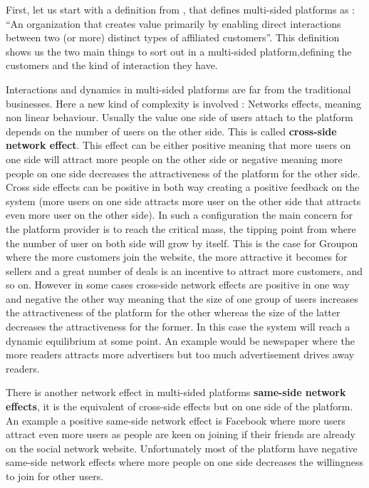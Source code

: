 \documentclass[10pt]{report}
\begin{document}
First, let us start with a definition from \autocite{Hagiu2011}, that defines multi-sided platforms as : \enquote{An organization that creates value primarily by enabling direct interactions between two (or more) distinct types of affiliated customers}. This definition shows us the two main things to sort out in a multi-sided platform,defining the customers and the kind of interaction they have. 

Interactions and dynamics in multi-sided platforms are far from the traditional businesses. Here a new kind of complexity is involved : Networks effects, meaning non linear behaviour. Usually the value one side of users attach to the platform depends on the number of users on the other side. This is called \textbf{cross-side network effect}. This effect can be either positive meaning that more users on one side will attract more people on the other side or negative meaning more people on one side decreases the attractiveness of the platform for the other side. Cross side effects can be positive in both way creating a positive feedback on the system (more users on one side attracts more user on the other side that attracts even more user on the other side). In such a configuration the main concern for the platform provider is to reach the critical mass, the tipping point from where the number of user on both side will grow by itself. \autocite{eisenmann2006strategies} This is the case for Groupon where the more customers join the website, the more attractive it becomes for sellers and a great number of deals is an incentive to attract more customers, and so on. However in some cases cross-side network effects are positive in one way and negative the other way meaning that the size of one group of users increases the attractiveness of the platform for the other whereas the size of the latter decreases the attractiveness for the former. In this case the system will reach a dynamic equilibrium at some point. An example would be newspaper where the more readers attracts more advertisers but too much advertisement drives away readers. \autocite{ParkerA05}

There is another network effect in multi-sided platforms \textbf{same-side network effects}, it is the equivalent of cross-side effects but on one side of the platform. An example a positive same-side network effect is Facebook where more users attract even more users as people are keen on joining if their friends are already on the social network website. Unfortunately most of the platform have negative same-side network effects where more people on one side decreases the willingness to join for other users.
\end{document}
